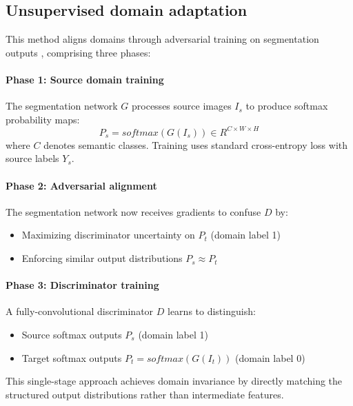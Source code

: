 \documentclass{article}
\begin{document}
\begin{multicols}{2}
\subsection{Unsupervised domain adaptation}  
 
This method aligns domains through adversarial training on segmentation outputs \cite{tsai2018learning}, comprising three phases:  

\paragraph{Phase 1: Source domain training}  
The segmentation network $G$ processes source images $I_s$ to produce softmax probability maps:  
\begin{equation}  
	P_s = {softmax}(G(I_s)) \in {R}^{C \times W \times H}  
\end{equation}  
where $C$ denotes semantic classes. Training uses standard cross-entropy loss with source labels $Y_s$.  



\paragraph{Phase 2: Adversarial alignment}  
The segmentation network now receives gradients to confuse $D$ by:  
\begin{itemize}  
	\item Maximizing discriminator uncertainty on $P_t$ (domain label 1)
	\item Enforcing similar output distributions $P_s \approx P_t$  

\end{itemize}  

\paragraph{Phase 3: Discriminator training}  
A fully-convolutional discriminator $D$ learns to distinguish:  
\begin{itemize}  
	\item Source softmax outputs $P_s$ (domain label 1)  
	\item Target softmax outputs $P_t = {softmax}(G(I_t))$ (domain label 0)  
\end{itemize}  


This single-stage approach achieves domain invariance by directly matching the structured output distributions rather than intermediate features.  




\end{multicols}
\end{document}
